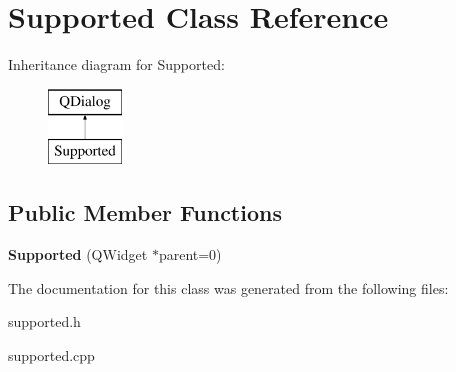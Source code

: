 \hypertarget{classSupported}{\section{Supported Class Reference}
\label{classSupported}
}
Inheritance diagram for Supported\-:\begin{figure}[H]
\begin{center}
\leavevmode
\includegraphics[height=2.000000cm]{classSupported}
\end{center}
\end{figure}
\subsection*{Public Member Functions}
\begin{DoxyCompactItemize}
\item 
\hypertarget{classSupported_a25d50afe2d3e394d407729dc58b0bc7d}{{\bfseries Supported} (Q\-Widget $\ast$parent=0)}\label{classSupported_a25d50afe2d3e394d407729dc58b0bc7d}

\end{DoxyCompactItemize}


The documentation for this class was generated from the following files\-:\begin{DoxyCompactItemize}
\item 
supported.\-h\item 
supported.\-cpp\end{DoxyCompactItemize}
